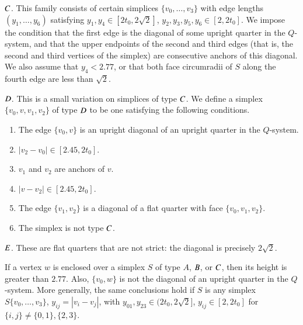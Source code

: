 $C$.  This family consists of certain simplices $\{v_0,\ldots,v_3\}$
with edge lengths $(y_1,\ldots,y_6)$ satisfying
    $y_1,y_4\in[2t_0,2\sqrt{2}]$, $y_2,y_3,y_5,y_6\in[2,2t_0]$.
We impose the condition that the first edge is the diagonal of
some upright quarter in the $Q$-system, and that the upper
endpoints of the second and third edges (that is, the second and
third vertices of the simplex) are consecutive anchors of this
diagonal. We also assume that $y_4< 2.77$, or that both face
circumradii of $S$ along the fourth edge are less than $\sqrt{2}$.

$D$.  This is
a small variation on simplices of type $C$.  
We define a simplex $\{v_0,v,v_1,v_2\}$ of type $D$
to be one satisfying the following conditions.
    \begin{enumerate}
    \item The edge $\{v_0,v\}$ is an upright diagonal of an upright quarter
        in the $Q$-system.
    \item $|v_2-v_0|\in[2.45,2t_0]$.
    \item $v_1$ and $v_2$ are anchors of $v$.
    \item $|v-v_2|\in [2.45,2t_0]$.
    \item The edge $\{v_1,v_2\}$
    is a diagonal of a flat quarter with face $\{v_0,v_1,v_2\}$.
    \item The simplex is not type $C$.
    \end{enumerate}



$E$.  These are flat quarters that are not strict: the diagonal is precisely
$2\sqrt2$.

\begin{lemma}
If a vertex $w$ is enclosed over a simplex $S$ of type $A$, $B$,
or $C$, then its height is greater than $2.77$.  Also, $\{v_0,w\}$
is not the diagonal of an upright quarter in the $Q$-system.
More generally, the same conclusions hold if $S$ is any simplex
$S\{v_0,\ldots,v_3\}$, $y_{ij}=|v_i-v_j|$, with $y_{01},y_{23}\in(2t_0,2\sqrt{2}]$,
$y_{ij}\in[2,2t_0]$ for $\{i,j\}\ne\{0,1\},\{2,3\}$.
\end{lemma}

